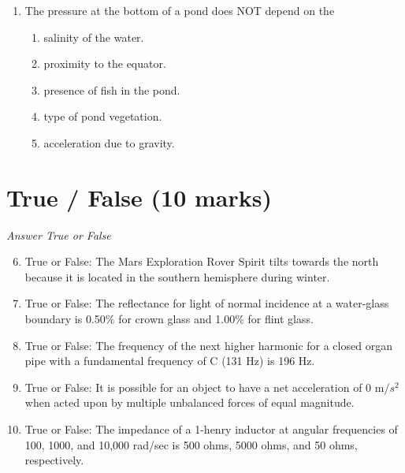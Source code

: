 \documentclass[12pt]{article}
\begin{document}
\begin{enumerate}[label=\arabic*.]
\begin{enumerate}[label=(\alph*)]
    \item 2.8 \ensuremath{\times} $10^10$ cm/sec
    \item 2.4 \ensuremath{\times} $10^10$ cm/sec
    \item 1.8 \ensuremath{\times} $10^10$ cm/sec
\end{enumerate}
\item The pressure at the bottom of a pond does NOT depend on the
\begin{enumerate}[label=(\alph*)]
    \item salinity of the water.
    \item proximity to the equator.
    \item presence of fish in the pond.
    \item type of pond vegetation.
    \item acceleration due to gravity.
\end{enumerate}
\end{enumerate}

\section*{True / False (10 marks)}
\textit{Answer True or False}
\begin{enumerate}[label=\arabic*.]
\setcounter{enumi}{5}
\item True or False: The Mars Exploration Rover Spirit tilts towards the north because it is located in the southern hemisphere during winter.
\item True or False: The reflectance for light of normal incidence at a water-glass boundary is 0.50\% for crown glass and 1.00\% for flint glass.
\item True or False: The frequency of the next higher harmonic for a closed organ pipe with a fundamental frequency of C (131 Hz) is 196 Hz.
\item True or False: It is possible for an object to have a net acceleration of 0 m/$s^2$ when acted upon by multiple unbalanced forces of equal magnitude.
\item True or False: The impedance of a 1-henry inductor at angular frequencies of 100, 1000, and 10,000 rad/sec is 500 ohms, 5000 ohms, and 50 ohms, respectively.
\end{enumerate}
\end{document}
